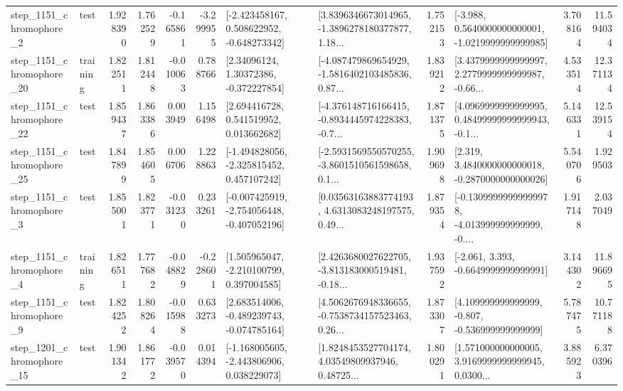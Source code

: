 \begin{tabular}{llrrrrllrlrr}
  step\_1151\_chromophore\_2 &      test &      1.928390 &    1.762529 &     -0.165861 & -3.299955 &   [-2.423458167, 0.508622952, -0.648273342] &  [3.8396346673014965, -1.3896278180377877, 1.18... &       1.752153 &  [-3.988, 0.5640000000000001, -1.0219999999999985] &            3.708164 &         11.594034 \\
 step\_1151\_chromophore\_20 &  training &      1.822511 &    1.812448 &     -0.010063 &  0.788766 &      [2.34096124, 1.30372386, -0.372227854] &  [-4.087479869654929, -1.5816402103485836, 0.87... &       1.839212 &  [3.4379999999999997, 2.2779999999999987, -0.66... &            4.533514 &         12.371134 \\
 step\_1151\_chromophore\_22 &      test &      1.859437 &    1.863386 &      0.003949 &  1.156498 &     [2.694416728, 0.541519952, 0.013662682] &  [-4.376148716166415, -0.8934445974228383, -0.7... &       1.871375 &  [4.0969999999999995, 0.48499999999999943, -0.1... &            5.146331 &         12.539154 \\
 step\_1151\_chromophore\_25 &      test &      1.847899 &    1.854605 &      0.006706 &  1.228863 &   [-1.494828056, -2.325815452, 0.457107242] &  [-2.5931569550570255, -3.8601510561598658, 0.1... &       1.909698 &   [2.319, 3.4840000000000018, -0.2870000000000026] &            5.540706 &          1.929503 \\
  step\_1151\_chromophore\_3 &      test &      1.855001 &    1.823771 &     -0.031230 &  0.233261 &  [-0.007425919, -2.754056448, -0.407052196] &  [0.03563163883774193, 4.6313083248197575, 0.49... &       1.879354 &  [-0.13099999999999978, -4.013999999999999, -0.... &            1.917148 &          2.037049 \\
  step\_1151\_chromophore\_4 &  training &      1.826511 &    1.777682 &     -0.048829 & -0.228601 &    [1.505965047, -2.210100799, 0.397004585] &  [2.4263680027622705, -3.813183000519481, -0.18... &       1.937592 &               [-2.061, 3.393, -0.6649999999999991] &            3.144302 &         11.896695 \\
  step\_1151\_chromophore\_9 &      test &      1.824252 &    1.808264 &     -0.015988 &  0.633273 &   [2.683514006, -0.489239743, -0.074785164] &  [4.5062676948336655, -0.7538734157523463, 0.26... &       1.873307 &    [4.109999999999999, -0.807, -0.536999999999999] &            5.787475 &         10.771188 \\
 step\_1201\_chromophore\_15 &      test &      1.901342 &    1.861772 &     -0.039570 &  0.014394 &   [-1.168005605, -2.443806906, 0.038229073] &  [1.8248453527704174, 4.03549809937946, 0.48725... &       1.800291 &  [1.571000000000005, 3.9169999999999945, 0.0300... &            3.885923 &          6.370396 \\

\end{tabular}

